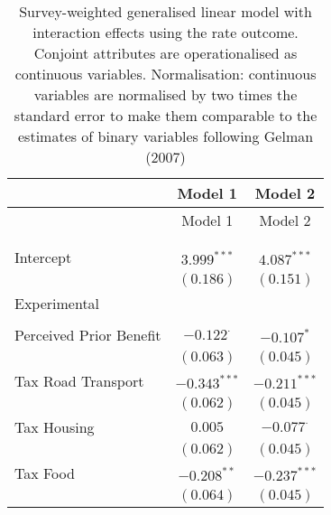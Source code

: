 
\begin{center}
\begin{tiny}
\begin{longtable}{l@{} c@{} c@{}}
\hline
 & Model 1 & Model 2 \\
\hline
\endfirsthead
\hline
 & Model 1 & Model 2 \\
\hline
\endhead
\hline
\endfoot
\hline
\multicolumn{3}{l}{\tiny{$^{***}p<0.001$; $^{**}p<0.01$; $^{*}p<0.05$; $^{\cdot}p<0.1$}}\\
\caption{Survey-weighted generalised linear model with interaction effects using the rate outcome. Conjoint attributes are operationalised as continuous variables. Normalisation: continuous variables are normalised by two times 
               the standard error to make them comparable to the estimates of binary variables following Gelman (2007)}
\label{table:weighted_interactions_exp_continous}
\endlastfoot \\
Intercept                                                 & $3.999^{***}$    & $4.087^{***}$    \\
                                                          & $(0.186)$        & $(0.151)$        \\
Experimental                                              &                  &                  \\
                                                          &                  &                  \\
\quad Perceived Prior Benefit                             & $-0.122^{\cdot}$ & $-0.107^{*}$     \\
                                                          & $(0.063)$        & $(0.045)$        \\
\quad Tax Road Transport                                  & $-0.343^{***}$   & $-0.211^{***}$   \\
                                                          & $(0.062)$        & $(0.045)$        \\
\quad Tax Housing                                         & $0.005$          & $-0.077^{\cdot}$ \\
                                                          & $(0.062)$        & $(0.045)$        \\
\quad Tax Food                                            & $-0.208^{**}$    & $-0.237^{***}$   \\
                                                          & $(0.064)$        & $(0.045)$        \\

\end{longtable}
\end{tiny}
\end{center}
